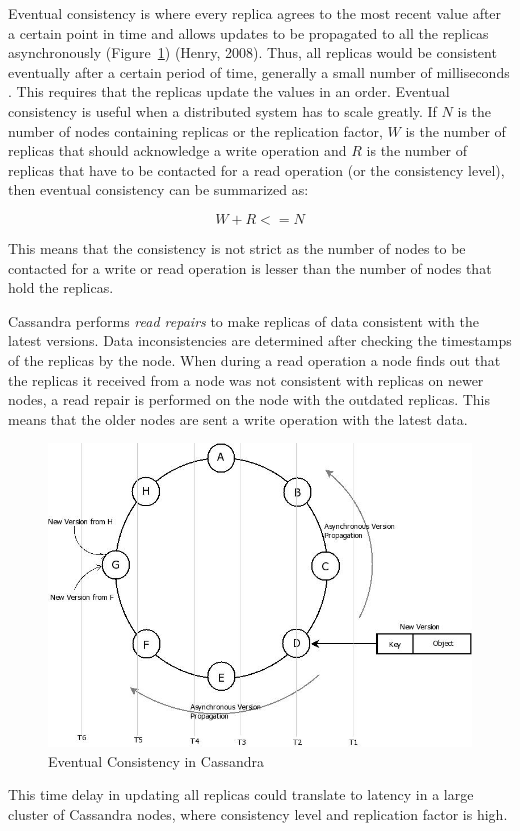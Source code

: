 \begin{description}
   Eventual consistency is where every replica agrees to the most recent value
   after a certain point in time and allows updates to be propagated to all the
   replicas asynchronously (Figure~\ref{f: eventual consistency}) (Henry, 2008).
   Thus, all replicas would be consistent eventually after a certain period of
   time, generally a small number of milliseconds .
   This requires that the replicas update the values in an order. Eventual
   consistency is useful when a distributed system has to scale greatly.
   If $N$ is the number of nodes containing replicas or the
  replication factor, $W$ is the number of replicas that should acknowledge a
  write operation and $R$ is the number of replicas that have to be contacted
  for a read operation (or the consistency level),
  then eventual consistency can be summarized as:%
  
  \begin{equation}
  	W + R <= N \nonumber  
  \end{equation}
  
  This means that the consistency is not strict as the number of nodes to be
  contacted for a write or read operation is lesser than the number of nodes
  that hold the replicas.
  
  Cassandra performs \textit{read repairs} to make replicas of data consistent
  with the latest versions. Data inconsistencies are determined after checking
  the timestamps of the replicas by the node.  When during a read operation a
  node finds out that the replicas it received from a node  was not consistent with
  replicas on newer nodes, a read repair is performed on the node with the
  outdated replicas. This means that the older
  nodes are sent a write operation with the latest data. 
  
  \begin{figure}[H]
\centering
\includegraphics[width=.7\textwidth]{./figure/Cassandra/Eventual-consistency-Cassandra.png}
	\caption{Eventual Consistency in Cassandra}\label{f: eventual consistency}
\end{figure}
   This time delay in updating all replicas could translate to latency in a
   large cluster of
  Cassandra nodes, where consistency level and replication factor is high. 
  

\end{description}
